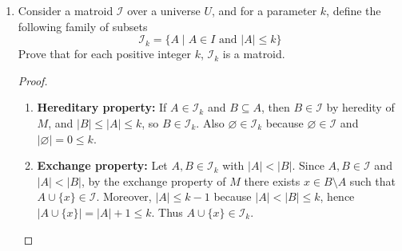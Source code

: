 \documentclass[12pt,a4paper]{article}
\theoremstyle{definition}
\begin{document}
\begin{enumerate}
\begin{enumerate}
\begin{proof}
\begin{enumerate}
            Since $B_3 \in \mathcal{B}$, its complement $(B_1^* \setminus \{x\}) \cup \{y\}$ is in $\mathcal{B}^*$.
        \end{enumerate}
        Since $\mathcal{I}'$ is non-empty ($\emptyset \in \mathcal{I}'$), satisfies the Hereditary Property, and satisfies the Exchange Property, the dual $\mathcal{I}'$ is a matroid.
    \end{proof}

      \item Consider a matroid $\mathcal{I}$ over a universe $U$, and for a parameter $k$, define the following family of subsets 
      \[
          \mathcal{I}_k = \{A \mid A \in I \,\, \text{and} \,\, |A| \leq k\}
      \]
      Prove that for each positive integer $k$, $\mathcal{I}_k$ is a matroid.

      \begin{proof}
        
        \begin{enumerate}
            Let $M=(U,\mathcal{I})$ be a matroid and $k\in\mathbb{N}^+$. And
            \[
            \mathcal{I}_k = \{A\in\mathcal{I}\mid |A|\le k\}.
            \]
            We prove that $(U,\mathcal{I}_k)$ is a matroid.
            \item \textbf{Hereditary property:} If $A\in\mathcal{I}_k$ and $B\subseteq A$, then $B\in\mathcal{I}$ by heredity of $M$, and $|B|\le|A|\le k$, so $B\in\mathcal{I}_k$. Also $\varnothing\in\mathcal{I}_k$ because $\varnothing\in\mathcal{I}$ and $|\varnothing|=0\le k$.
            
            \item \textbf{Exchange property:} Let $A,B\in\mathcal{I}_k$ with $|A|<|B|$. Since $A,B\in\mathcal{I}$ and $|A|<|B|$, by the exchange property of $M$ there exists $x\in B\setminus A$ such that $A\cup\{x\}\in\mathcal{I}$. Moreover, $|A|\le k-1$ because $|A|<|B|\le k$, hence $|A\cup\{x\}|=|A|+1\le k$. Thus $A\cup\{x\}\in\mathcal{I}_k$.
        \end{enumerate}
          
      \end{proof}
    \end{enumerate}

\end{enumerate}

\end{document}
